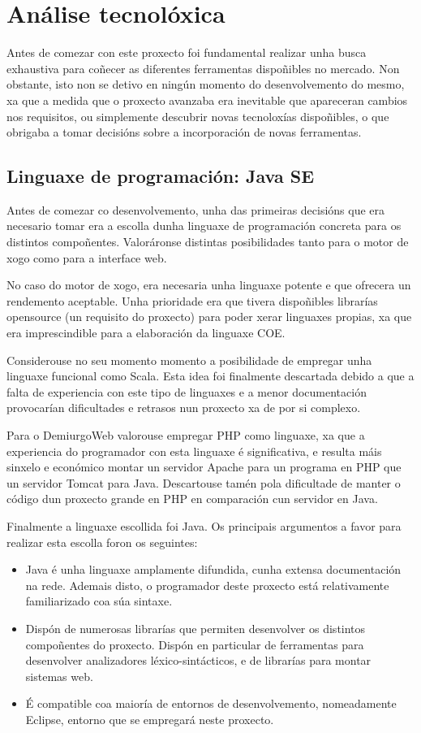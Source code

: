 \section{Análise tecnolóxica}
Antes de comezar con este proxecto foi fundamental realizar unha busca
exhaustiva para coñecer as diferentes ferramentas dispoñibles no mercado. Non
obstante, isto non se detivo en ningún momento do desenvolvemento do mesmo, xa
que a medida que o proxecto avanzaba era inevitable que apareceran cambios nos
requisitos, ou simplemente descubrir novas tecnoloxías dispoñibles, o que
obrigaba a tomar decisións sobre a incorporación de novas ferramentas.

\subsection{Linguaxe de programación: Java SE}
Antes de comezar co desenvolvemento, unha das primeiras decisións que era
necesario tomar era a escolla dunha linguaxe de programación concreta para os
distintos compoñentes. Valoráronse distintas posibilidades tanto para o motor de
xogo como para a interface web.
\par
No caso do motor de xogo, era necesaria unha linguaxe potente e que ofrecera un
rendemento aceptable. Unha prioridade era que tivera dispoñibles librarías
opensource (un requisito do proxecto) para poder xerar linguaxes propias, xa que
era imprescindible para a elaboración da linguaxe COE.
\par
Considerouse no seu momento momento a posibilidade de empregar unha linguaxe
funcional como Scala. Esta idea foi finalmente descartada debido a que a falta
de experiencia con este tipo de linguaxes e a menor documentación provocarían
dificultades e retrasos nun proxecto xa de por si complexo.
\par
Para o DemiurgoWeb valorouse empregar PHP como linguaxe, xa que a experiencia do
programador con esta linguaxe é significativa, e resulta máis sinxelo e
económico montar un servidor Apache para un programa en PHP que un servidor
Tomcat para Java.
Descartouse tamén pola dificultade de manter o código dun proxecto grande en PHP
en comparación cun servidor en Java.
\par
Finalmente a linguaxe escollida foi Java. Os principais argumentos a favor
para realizar esta escolla foron os seguintes:
\begin{itemize}
  \item Java é unha linguaxe amplamente difundida, cunha extensa documentación
  na rede. Ademais disto, o programador deste proxecto está relativamente
  familiarizado coa súa sintaxe.
  \item Dispón de numerosas librarías que permiten desenvolver os distintos
  compoñentes do proxecto. Dispón en particular de ferramentas para desenvolver
  analizadores léxico-sintácticos, e de librarías para montar sistemas web.
  \item É compatible coa maioría de entornos de desenvolvemento, nomeadamente
  Eclipse, entorno que se empregará neste proxecto.
\end{itemize}

